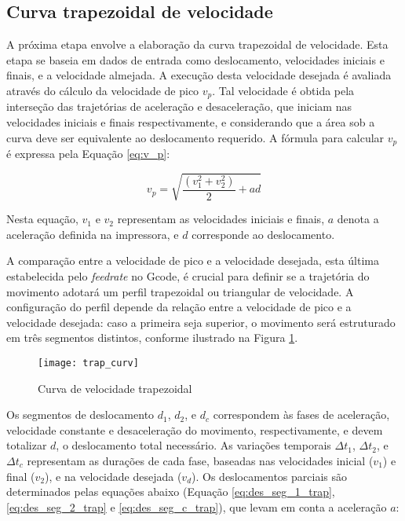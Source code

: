 \subsection{Curva trapezoidal de velocidade}

A próxima etapa  envolve a elaboração da curva trapezoidal de velocidade. Esta etapa se baseia em dados de entrada como deslocamento, velocidades iniciais e finais, e a velocidade almejada. A execução desta velocidade desejada é avaliada através do cálculo da velocidade de pico \(v_p\). Tal velocidade é obtida pela interseção das trajetórias de aceleração e desaceleração, que iniciam nas velocidades iniciais e finais respectivamente, e considerando que a área sob a curva deve ser equivalente ao deslocamento requerido. A fórmula para calcular \(v_p\) é expressa pela Equação \ref{eq:v_p}:

\begin{equation}
    \label{eq:v_p}
    v_p = \sqrt{\frac{(v_1^2+v_2^2)}{2}+a d}
\end{equation}

Nesta equação, \(v_1\) e \(v_2\) representam as velocidades iniciais e finais, \(a\) denota a aceleração definida na impressora, e \(d\) corresponde ao deslocamento.

A comparação entre a velocidade de pico e a velocidade desejada, esta última estabelecida pelo \textit{feedrate} no Gcode, é crucial para definir se a trajetória do movimento adotará um perfil trapezoidal ou triangular de velocidade. A configuração do perfil depende da relação entre a velocidade de pico e a velocidade desejada: caso a primeira seja superior, o movimento será estruturado em três segmentos distintos, conforme ilustrado na Figura \ref{fig:trap_curv}.

\begin{figure}[H]
    \centering
    \caption{Curva de velocidade trapezoidal}
    \texttt{[image: trap\_curv]}
    \label{fig:trap_curv}
\end{figure}

Os segmentos de deslocamento \(d_1\), \(d_2\), e \(d_c\) correspondem às fases de aceleração, velocidade constante e desaceleração do movimento, respectivamente, e devem totalizar \(d\), o deslocamento total necessário. As variações temporais \(\Delta t_1\), \(\Delta t_2\), e \(\Delta t_c\) representam as durações de cada fase, baseadas nas velocidades inicial (\(v_1\)) e final (\(v_2\)), e na velocidade desejada (\(v_d\)). Os deslocamentos parciais são determinados pelas equações abaixo (Equação \ref{eq:des_seg_1_trap},  \ref{eq:des_seg_2_trap} e  \ref{eq:des_seg_c_trap}), que levam em conta a aceleração \(a\):

